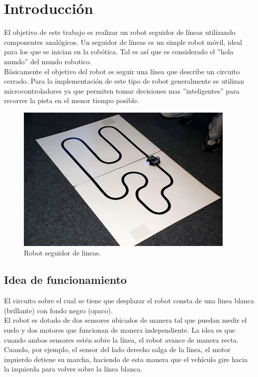\documentclass[a4paper]{article}
\begin{document}
\section{ \textbf{Introducción}}


El objetivo de este trabajo es realizar un robot seguidor de líneas utilizando componentes analógicos.
Un seguidor de líneas es un simple robot móvil, ideal para los que se inician en la robótica. Tal es así que es considerado el ''hola mundo'' del mundo robotico.\\

Básicamente el objetivo del robot es seguir una línea que describe un circuito cerrado.
Para la implementación de este tipo de robot generalmente se utilizan microcontroladores ya que permiten tomar decisiones mas ''inteligentes'' para recorrer la pista en el menor tiempo posible.


\begin{figure}[H]
  \centering
    \includegraphics[width=\textwidth]{./imagenes/robot_ejemplo.jpg}
  \caption{Robot seguidor de lineas.}
\end{figure}

\newpage

\subsection{Idea de funcionamiento}

El circuito sobre el cual se tiene que desplazar el robot consta de una linea blanca (brillante) con fondo negro (opaco).\\

El robot es dotado de dos sensores ubicados de manera tal que puedan medir el suelo y dos motores que funcionan de manera independiente. 
La idea es que cuando ambos sensores estén sobre la línea, el robot avance de manera recta. Cuando, por ejemplo, el sensor del lado derecho salga de la línea,
el motor izquierdo detiene su marcha, haciendo de esta manera que el vehículo gire hacia la izquierda para volver sobre la línea blanca.
\end{document}
